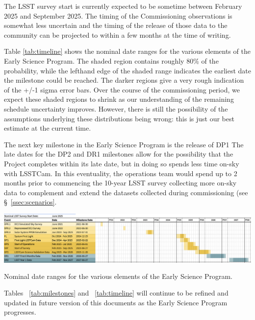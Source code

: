 The LSST survey start is currently expected to be sometime between February 2025 and September 2025.
The timing of the Commissioning observations is somewhat less uncertain and the timing of the release of those data to the community can be projected to within a few months at the time of writing.

Table \ref{tab:timeline} shows the nominal date ranges for the various elements of the Early Science Program. 
The shaded region contains roughly 80\% of the probability, while the lefthand edge of the shaded range indicates the earliest date the milestone could be reached. 
The darker regions give a very rough indication of the +/-1 sigma error bars. 
Over the course of the commissioning period, we expect these shaded regions to shrink as our understanding of the remaining schedule uncertainty improves. 
However, there is still the possibility of the assumptions underlying these distributions being wrong: this is just our best estimate at the current time.

The next key milestone in the Early Science Program is the release of DP1
The late dates for the DP2 and DR1 milestones allow for the possibility that the Project completes within its late date, but in doing so spends less time on-sky with LSSTCam.
In this eventuality, the operations team would spend up to 2 months prior to commencing the 10-year LSST survey collecting more on-sky data to complement and extend the datasets collected during commissioning (see \S~\ref{ssec:scenarios}. 
\begin{table}[ht]
\centering
\includegraphics[width=\linewidth]{figures/DPR-timeline}
\caption{Nominal date ranges for the various elements of the Early Science Program.}
\label{tab:timeline}
\end{table}

Tables ~\ref{tab:milestones} and ~\ref{tab:timeline} will continue to be refined and updated in future version of this documents as the Early Science Program progresses.
